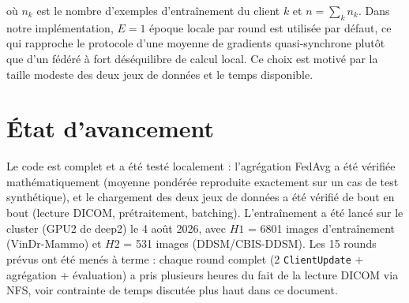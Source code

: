 \documentclass[12pt,a4paper]{report}
\begin{document}
où $n_k$ est le nombre d'exemples d'entraînement du client $k$ et
$n = \sum_k n_k$. Dans notre implémentation, $E{=}1$ époque locale par round
est utilisée par défaut, ce qui rapproche le protocole d'une moyenne de
gradients quasi-synchrone plutôt que d'un fédéré à fort déséquilibre de
calcul local. Ce choix est motivé par la taille modeste des deux jeux de
données et le temps disponible.

\section{État d'avancement}
Le code est complet et a été testé localement : l'agrégation FedAvg a été
vérifiée mathématiquement (moyenne pondérée reproduite exactement sur un
cas de test synthétique), et le chargement des deux jeux de données a été
vérifié de bout en bout (lecture DICOM, prétraitement, batching).
L'entraînement a été lancé sur le cluster (GPU2 de deep2) le 4 août 2026, avec
$H1$ = 6801 images d'entraînement (VinDr-Mammo) et $H2$ = 531 images
(DDSM/CBIS-DDSM). Les 15 rounds prévus ont été menés à terme : chaque round
complet (2 \texttt{ClientUpdate} + agrégation + évaluation) a pris plusieurs
heures du fait de la lecture DICOM via NFS, voir contrainte de temps
discutée plus haut dans ce document.
\end{document}
